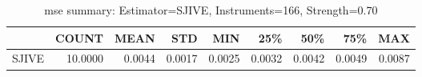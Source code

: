 \begin{table}[ht]
\centering
\caption{mse summary: Estimator=SJIVE, Instruments=166, Strength=0.70}
\begin{tabular}{lrrrrrrrr}
\toprule
 & COUNT & MEAN & STD & MIN & 25\% & 50\% & 75\% & MAX \\
\midrule
SJIVE & 10.0000 & 0.0044 & 0.0017 & 0.0025 & 0.0032 & 0.0042 & 0.0049 & 0.0087 \\
\bottomrule
\end{tabular}
\end{table}
